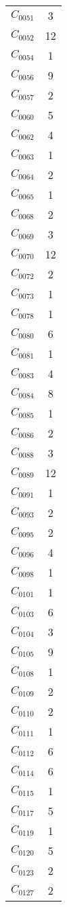 \documentclass[a4paper,10pt]{article}
\begin{document}
\begin{center}
\begin{longtable}{cc}
$C_{0051}$ & 3 \\
$C_{0052}$ & 12 \\
$C_{0054}$ & 1 \\
$C_{0056}$ & 9 \\
$C_{0057}$ & 2 \\
$C_{0060}$ & 5 \\
$C_{0062}$ & 4 \\
$C_{0063}$ & 1 \\
$C_{0064}$ & 2 \\
$C_{0065}$ & 1 \\
$C_{0068}$ & 2 \\
$C_{0069}$ & 3 \\
$C_{0070}$ & 12 \\
$C_{0072}$ & 2 \\
$C_{0073}$ & 1 \\
$C_{0078}$ & 1 \\
$C_{0080}$ & 6 \\
$C_{0081}$ & 1 \\
$C_{0083}$ & 4 \\
$C_{0084}$ & 8 \\
$C_{0085}$ & 1 \\
$C_{0086}$ & 2 \\
$C_{0088}$ & 3 \\
$C_{0089}$ & 12 \\
$C_{0091}$ & 1 \\
$C_{0093}$ & 2 \\
$C_{0095}$ & 2 \\
$C_{0096}$ & 4 \\
$C_{0098}$ & 1 \\
$C_{0101}$ & 1 \\
$C_{0103}$ & 6 \\
$C_{0104}$ & 3 \\
$C_{0105}$ & 9 \\
$C_{0108}$ & 1 \\
$C_{0109}$ & 2 \\
$C_{0110}$ & 2 \\
$C_{0111}$ & 1 \\
$C_{0112}$ & 6 \\
$C_{0114}$ & 6 \\
$C_{0115}$ & 1 \\
$C_{0117}$ & 5 \\
$C_{0119}$ & 1 \\
$C_{0120}$ & 5 \\
$C_{0123}$ & 2 \\
$C_{0127}$ & 2 \\

\end{longtable}
\end{center}
\end{document}
